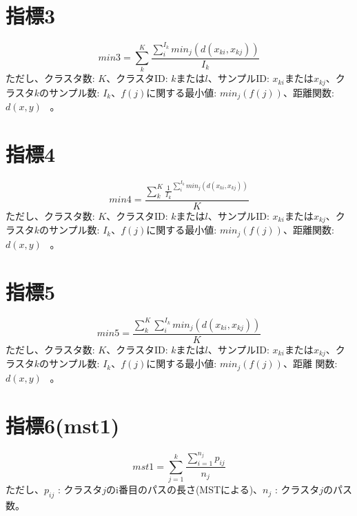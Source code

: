 \documentclass{article}
\begin{document}
\section{指標3}
\begin{equation}
min3={\sum_{k}^{K}{\frac{\sum_{i}^{I_k}{min_j(d(x_{ki},x_{kj}))}}{I_k}}}
\end{equation}
ただし、クラスタ数: $K$、クラスタID: $k$または$l$、サンプルID: $x_{ki}$または$x_{kj}$、クラスタ$k$のサンプル数: $I_k$、$f(j)$に関する最小値: $min_j(f(j))$、距離関数:$d(x,y)$  \ 。

\section{指標4}
\begin{equation}
min4={\frac{\sum_{k}^{K}{{\frac{1}{I_k}}^{\sum_{i}^{I_k}{min_j(d(x_{ki},x_{kj}))}}}}{K}}
\end{equation}
ただし、クラスタ数: $K$、クラスタID: $k$または$l$、サンプルID: $x_{ki}$または$x_{kj}$、クラスタ$k$のサンプル数: $I_k$、$f(j)$に関する最小値: $min_j(f(j))$、距離関数:$d(x,y)$  \ 。

\section{指標5}
\begin{equation}
min5=\frac{ \sum_{k}^{K}{ \sum_{i}^{I_k}{min_j(d(x_{ki},x_{kj}))}  }  }{K}
\end{equation}
ただし、クラスタ数: $K$、クラスタID: $k$または$l$、サンプルID: $x_{ki}$または$x_{kj}$、クラスタ$k$のサンプル数: $I_k$、$f(j)$に関する最小値: $min_j(f(j))$、距離
関数:$d(x,y)$  \ 。


\section{指標6(mst1)}
\begin{equation}
mst1 = { \sum_{j=1}^{k}{ \frac{\sum_{i=1}^{n_j}{p_{ij}}}{n_j} } }
\end{equation}
ただし、$p_{ij}$ : クラスタ$j$のi番目のパスの長さ(MSTによる)、$n_j$ : クラスタ$j$のパス数。
\end{document}
